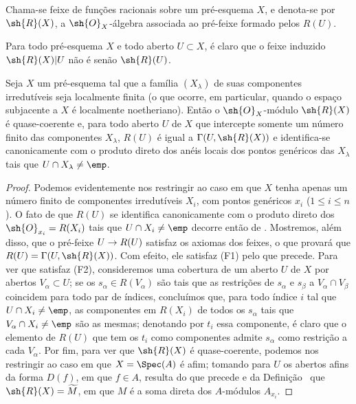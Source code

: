 \documentclass[oneside]{amsart}
\makeatletter
\renewcommand{\leq}{\leqslant}
\newcommand{\ega@arrow}[2]{\mathchoice{#1}{#2}{#2}{#2}}
\renewcommand{\to}{\ega@arrow{\longrightarrow}{\rightarrow}}
\newcommand{\oldpage}[2][]{{\marginnote{\normalfont\textbf{#1}~|~#2}}\ignorespaces}
\let\EGAOriginalLabel\label
\renewcommand{\label}[1]{\phantomsection\EGAOriginalLabel{#1}}
\makeatother
\begin{document}
\oldpage[I]{162}
\begin{definition}[7.3.2]
\label{I.7.3.2}
Chama-se feixe de funções racionais sobre um pré-esquema $X$, e denota-se por $\sh{R}(X)$, a $\sh{O}_X$-álgebra associada ao pré-feixe formado pelos $R(U)$.
\end{definition}

Para todo pré-esquema $X$ e todo aberto $U\subset X$, é claro que o feixe induzido $\sh{R}(X)|U$ não é senão $\sh{R}(U)$.

\begin{proposition}[7.3.3]
\label{I.7.3.3}
Seja $X$ um pré-esquema tal que a família $(X_\lambda)$ de suas componentes irredutíveis seja localmente finita (o que ocorre, em particular, quando o espaço subjacente a $X$ é localmente noetheriano).
Então o $\sh{O}_X$-módulo $\sh{R}(X)$ é quase-coerente e, para todo aberto $U$ de $X$ que intercepte somente um número finito das componentes $X_\lambda$, $R(U)$ é igual a $\Gamma(U,\sh{R}(X))$ e identifica-se canonicamente com o produto direto dos anéis locais dos pontos genéricos das $X_\lambda$ tais que $U\cap X_\lambda\neq\emp$.
\end{proposition}

\begin{proof}
Podemos evidentemente nos restringir ao caso em que $X$ tenha apenas um número finito de componentes irredutíveis $X_i$, com pontos genéricos $x_i$ ($1\leq i\leq n$).
O fato de que $R(U)$ se identifica canonicamente com o produto direto dos $\sh{O}_{x_i}=R(X_i)$ tais que $U\cap X_i\neq\emp$ decorre então de .
Mostremos, além disso, que o pré-feixe $U\to R(U)$ satisfaz os axiomas dos feixes, o que provará que $R(U)=\Gamma(U,\sh{R}(X))$.
Com efeito, ele satisfaz (F1) pelo que precede.
Para ver que satisfaz (F2), consideremos uma cobertura de um aberto $U$ de $X$ por abertos $V_\alpha\subset U$; se os $s_\alpha\in R(V_\alpha)$ são tais que as restrições de $s_\alpha$ e $s_\beta$ a $V_\alpha\cap V_\beta$ coincidem para todo par de índices, concluímos que, para todo índice $i$ tal que $U\cap X_i\neq\emp$, as componentes em $R(X_i)$ de todos os $s_\alpha$ tais que $V_\alpha\cap X_i\neq\emp$ são as mesmas; denotando por $t_i$ essa componente, é claro que o elemento de $R(U)$ que tem os $t_i$ como componentes admite $s_\alpha$ como restrição a cada $V_\alpha$.
Por fim, para ver que $\sh{R}(X)$ é quase-coerente, podemos nos restringir ao caso em que $X=\Spec(A)$ é afim; tomando para $U$ os abertos afins da forma $D(f)$, em que $f\in A$, resulta do que precede e da Definição~ que $\sh{R}(X)=\widetilde{M}$, em que $M$ é a soma direta dos $A$-módulos $A_{x_i}$.
\end{proof}
\end{document}
